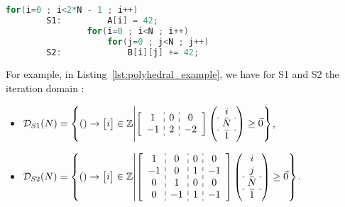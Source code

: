 \documentclass[paper=a4, fontsize=11pt]{scrartcl}
\numberwithin{equation}{section}        %
\numberwithin{figure}{section}          %
\numberwithin{table}{section}               %
\begin{document}
        \begin{lstlisting}[frame=single, language=C, caption={Simple code for polyhedral model example}, label={lst:polyhedral_example}]
                for(i=0 ; i<2*N - 1 ; i++)
        S1:         A[i] = 42;
                for(i=0 ; i<N ; i++)
                    for(j=0 ; j<N ; j++)
        S2:             B[i][j] += 42;
        \end{lstlisting}
                
                For example, in Listing~\ref{lst:polyhedral_example}, we have for
                S1 and S2 the iteration domain :
                \begin{itemize}
                    \item[]$ \mathcal{D}_{S1}(N) = \left\{() \to \begin{bmatrix}i\end{bmatrix} \in \mathbb{Z} \middle|
                    \left[\begin{array}{c:c:c}
                            1 & 0 & 0 \\
                            -1 & 2 & -2
                    \end{array}\right]
                    \left(\begin{array}{c}
                            i \\ \hdashline
                            N \\ \hdashline
                            1 
                    \end{array}\right)
                    \geq \vec{0}
                    \right\} $,
                
                    \item[]$ \mathcal{D}_{S2}(N) = \left\{() \to \begin{bmatrix}i\end{bmatrix} \in \mathbb{Z} \middle|
                    \left[\begin{array}{c:c:c:c}
                            1 & 0 & 0 & 0\\
                            -1 & 0 & 1 & -1\\
                            0 & 1 & 0 & 0\\
                            0 & -1 & 1 & -1
                    \end{array}\right]
                    \left(\begin{array}{c}
                            i \\
                            j \\ \hdashline
                            N \\ \hdashline
                            1 
                    \end{array}\right)
                    \geq \vec{0}
                    \right\} $.
                \end{itemize}
\end{document}

